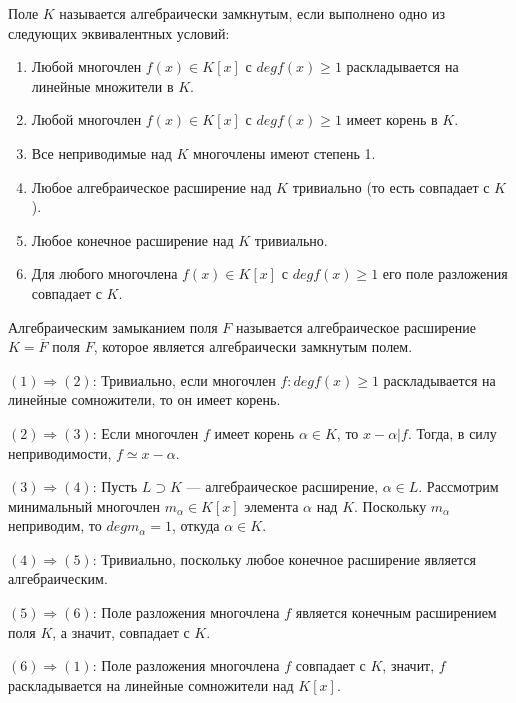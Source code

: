 \Def Поле $K$ называется алгебраически замкнутым, если выполнено одно из следующих эквивалентных условий:

\begin{enumerate}
\item Любой многочлен $f(x) \in K[x]$ с $deg f (x) \geqslant 1$ раскладывается на линейные множители в $K$.
\item  Любой многочлен $f(x) \in K[x]$ с $deg f (x) \geqslant 1$ имеет корень в $K$.
\item Все неприводимые над $K$ многочлены имеют степень 1.
\item Любое алгебраическое расширение над $K$ тривиально (то есть совпадает с $K$).
\item Любое конечное расширение над $K$ тривиально.
\item Для любого многочлена $f(x) \in K[x]$ с $deg f (x) \geqslant 1$ его поле разложения совпадает с $K$.
\end{enumerate}

\Def Алгебраическим замыканием поля $F$ называется алгебраическое расширение $K = \overline{F}$ поля $F$, которое является алгебраически замкнутым полем.

\Proof 
$(1) \Rightarrow (2)$: Тривиально, если многочлен $f: deg f(x) \geqslant 1$ раскладывается на линейные сомножители, то он имеет корень.

$(2) \Rightarrow (3)$: Если многочлен $f$ имеет корень $\alpha \in K$, то $x - \alpha | f$. Тогда, в силу неприводимости, $f \simeq x - \alpha$.

$(3) \Rightarrow (4)$: Пусть $L \supset K$ — алгебраическое расширение, $\alpha \in L$. Рассмотрим минимальный многочлен $m_{\alpha} \in K[x]$ элемента $\alpha$ над $K$. Поскольку $m_{\alpha}$ неприводим, то $deg m_{\alpha} = 1$, откуда $\alpha \in K$.

$(4) \Rightarrow (5)$: Тривиально, поскольку любое конечное расширение является алгебраическим.

$(5) \Rightarrow (6)$: Поле разложения многочлена $f$ является конечным расширением поля $K$, а значит, совпадает с $K$.

$(6) \Rightarrow (1)$: Поле разложения многочлена $f$ совпадает с $K$, значит, $f$ раскладывается на линейные сомножители над $K[x]$.
\EndProof